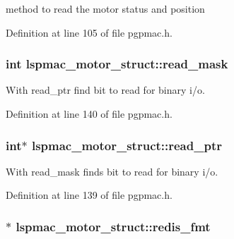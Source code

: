method to read the motor status and position 



Definition at line 105 of file pgpmac.\-h.

\hypertarget{structlspmac__motor__struct_a3c24ed30c5a3ad490c6139b2780b2af7}{
\subsubsection[{read\-\_\-mask}]{\setlength{\rightskip}{0pt plus 5cm}int lspmac\-\_\-motor\-\_\-struct\-::read\-\_\-mask}}\label{structlspmac__motor__struct_a3c24ed30c5a3ad490c6139b2780b2af7}


With read\-\_\-ptr find bit to read for binary i/o. 



Definition at line 140 of file pgpmac.\-h.

\hypertarget{structlspmac__motor__struct_a844b28ccabab5048ca216db074fb9704}{
\subsubsection[{read\-\_\-ptr}]{\setlength{\rightskip}{0pt plus 5cm}int$\ast$ lspmac\-\_\-motor\-\_\-struct\-::read\-\_\-ptr}}\label{structlspmac__motor__struct_a844b28ccabab5048ca216db074fb9704}


With read\-\_\-mask finds bit to read for binary i/o. 



Definition at line 139 of file pgpmac.\-h.

\hypertarget{structlspmac__motor__struct_a91c38b2072d878b71f4e77de2f1375a4}{
\subsubsection[{redis\-\_\-fmt}]{$\ast$ lspmac\-\_\-motor\-\_\-struct\-::redis\-\_\-fmt}}\label{structlspmac__motor__struct_a91c38b2072d878b71f4e77de2f1375a4}


